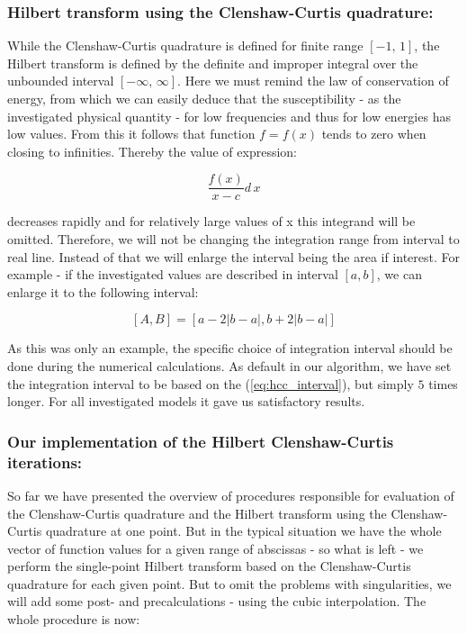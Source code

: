 \documentclass[12pt,twoside,a4paper]{article}
\numberwithin{equation}{subsection}
\numberwithin{figure}{subsection}
\begin{document}
\subsubsection*{Hilbert transform using the Clenshaw-Curtis quadrature:}

While the Clenshaw-Curtis quadrature is defined for finite range $[-1,\,1]$, the Hilbert transform is defined by the definite and improper
integral over the unbounded interval $[-\infty,\, \infty]$. Here we must remind the law of conservation of energy, from which we can easily
deduce that the susceptibility - as the investigated physical quantity - for low frequencies and thus for low energies has low
values. From this it follows that function $f = f(x)$ tends to zero when closing to infinities. Thereby the value of expression:

\begin{equation} \label{eq:hcc_adapt}
  \frac{f(x)}{x-c} d \, x
\end{equation}

decreases rapidly and for relatively large values of x this integrand will be omitted. Therefore, we will not be changing the integration
range from interval to real line. Instead of that we will enlarge the interval being the area if interest. For example - if the investigated
values are described in interval $[a, b]$, we can enlarge it to the following interval:

\begin{equation} \label{eq:hcc_interval}
  [A, B] = [a - 2|b-a|, b + 2|b-a|] 
\end{equation}

As this was only an example, the specific choice of integration interval should be done during the numerical calculations. As default in our
algorithm, we have set the integration interval to be based on the (\ref{eq:hcc_interval}), but simply $5$ times longer. For all
investigated models it gave us satisfactory results.

\subsubsection*{Our implementation of the Hilbert Clenshaw-Curtis iterations:}

So far we have presented the overview of procedures responsible for evaluation of the Clenshaw-Curtis qua\-dra\-tu\-re and the Hil\-bert
transform using the Clenshaw-Curtis qua\-dra\-ture at one point. But in the typical situation we have the whole vector of function values
for a given range of abscissas - so what is left - we perform the single-point Hil\-bert transform based on the Clenshaw-Curtis
qua\-dra\-ture for each given point. But to omit the problems with singularities, we will add some post- and precalculations - using the cubic interpolation. The
whole procedure is now:
\end{document}
